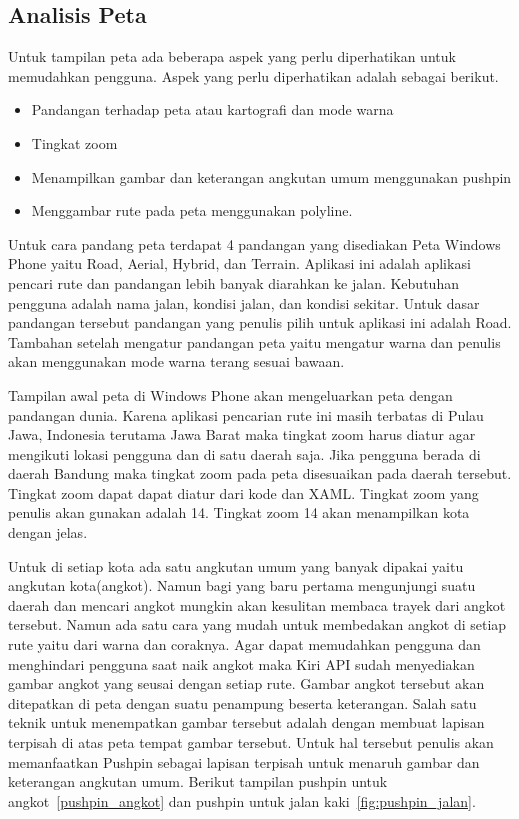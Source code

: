 \subsection{Analisis Peta}
\label{lab:Analisis Peta}
\hspace{0.5cm} Untuk tampilan peta ada beberapa aspek yang perlu diperhatikan untuk memudahkan pengguna. Aspek yang perlu diperhatikan adalah sebagai berikut.
\begin{itemize}
	\item Pandangan terhadap peta atau kartografi dan mode warna
	\item Tingkat zoom
	\item Menampilkan gambar dan keterangan angkutan umum menggunakan pushpin
	\item Menggambar rute pada peta menggunakan polyline.
\end{itemize}

\hspace{0.5cm} Untuk cara pandang peta terdapat 4 pandangan yang disediakan Peta Windows Phone yaitu Road, Aerial, Hybrid, dan Terrain. Aplikasi ini adalah aplikasi pencari rute dan pandangan lebih banyak diarahkan ke jalan. Kebutuhan pengguna adalah nama jalan, kondisi jalan, dan kondisi sekitar. Untuk dasar pandangan tersebut pandangan yang penulis pilih untuk aplikasi ini adalah Road. Tambahan setelah mengatur pandangan peta yaitu mengatur warna dan penulis akan menggunakan mode warna terang sesuai bawaan.

\hspace{0.5cm} Tampilan awal peta di Windows Phone akan mengeluarkan peta dengan pandangan dunia. Karena aplikasi pencarian rute ini masih terbatas di Pulau Jawa, Indonesia terutama Jawa Barat maka tingkat zoom harus diatur agar mengikuti lokasi pengguna dan di satu daerah saja. Jika pengguna berada di daerah Bandung maka tingkat zoom pada peta disesuaikan pada daerah tersebut. Tingkat zoom dapat dapat diatur dari kode dan XAML. Tingkat zoom yang penulis akan gunakan adalah 14. Tingkat zoom 14 akan menampilkan kota dengan jelas.

\hspace{0.5cm} Untuk di setiap kota ada satu angkutan umum yang banyak dipakai yaitu angkutan kota(angkot). Namun bagi yang baru pertama mengunjungi suatu daerah dan mencari angkot mungkin akan kesulitan membaca trayek dari angkot tersebut. Namun ada satu cara yang mudah untuk membedakan angkot di setiap rute yaitu dari warna dan coraknya. Agar dapat memudahkan pengguna dan menghindari pengguna saat naik angkot maka Kiri API sudah menyediakan gambar angkot yang seusai dengan setiap rute. Gambar angkot tersebut akan ditepatkan di peta dengan suatu penampung beserta keterangan. Salah satu teknik untuk menempatkan gambar tersebut adalah dengan membuat lapisan terpisah di atas peta tempat gambar tersebut. Untuk hal tersebut penulis akan memanfaatkan Pushpin sebagai lapisan terpisah untuk menaruh gambar dan keterangan angkutan umum. Berikut tampilan pushpin untuk angkot~\ref{pushpin_angkot} dan pushpin untuk jalan kaki~\ref{fig:pushpin_jalan}.

